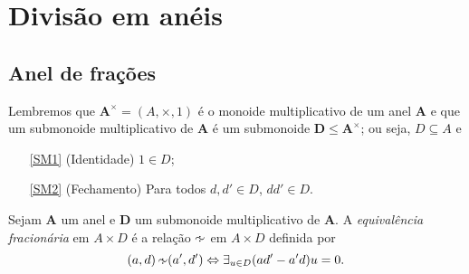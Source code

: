 \section{Divisão em anéis}

\subsection{Anel de frações}

Lembremos que  $\bm A^\times = (A,\times,1)$ é o monoide multiplicativo de um anel $\bm A$ e que um submonoide multiplicativo de $\bm A$ é um submonoide $\bm D \leq \bm A^\times$; ou seja, $D \subseteq A$ e
	\begin{enumerate}
	\item[\ref{SM1}] (Identidade)  $1 \in D$;
	\item[\ref{SM2}] (Fechamento) Para todos $d,d' \in D$, $dd' \in D$.
	\end{enumerate}

\begin{definition}
Sejam $\bm A$ um anel e $\bm D$ um submonoide multiplicativo de $\bm A$. A \emph{equivalência fracionária} em $A \times D$ é a relação $\simfra$ em $A \times D$ definida por
	\begin{equation*}
	(a,d) \simfra (a',d') \Leftrightarrow \exists_{u \in D} (ad'-a'd)u = 0.
	\end{equation*}
\end{definition}

